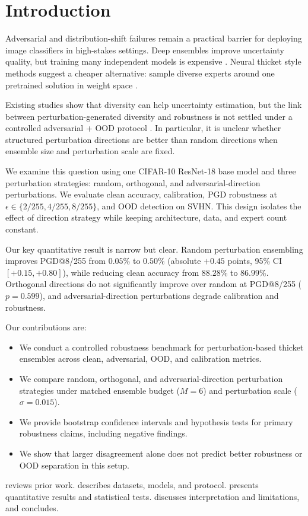 \section{Introduction}
\label{sec:introduction}

Adversarial and distribution-shift failures remain a practical barrier for deploying image classifiers in high-stakes settings. Deep ensembles improve uncertainty quality, but training many independent models is expensive \citep{lakshminarayanan2017deep}. Neural thicket style methods suggest a cheaper alternative: sample diverse experts around one pretrained solution in weight space \citep{gan2026neuralthickets,mehrtash2020pep}.

 Existing studies show that diversity can help uncertainty estimation, but the link between perturbation-generated diversity and robustness is not settled under a controlled adversarial + OOD protocol \citep{xia2022usefulness,wei2020xensemble}. In particular, it is unclear whether structured perturbation directions are better than random directions when ensemble size and perturbation scale are fixed.

We examine this question using one CIFAR-10 ResNet-18 base model and three perturbation strategies: random, orthogonal, and adversarial-direction perturbations. We evaluate clean accuracy, calibration, PGD robustness at $\epsilon\in\{2/255,4/255,8/255\}$, and OOD detection on SVHN. This design isolates the effect of direction strategy while keeping architecture, data, and expert count constant.

Our key quantitative result is narrow but clear. Random perturbation ensembling improves PGD@8/255 from $0.05\%$ to $0.50\%$ (absolute $+0.45$ points, 95\% CI $[+0.15,+0.80]$), while reducing clean accuracy from $88.28\%$ to $86.99\%$. Orthogonal directions do not significantly improve over random at PGD@8/255 ($p=0.599$), and adversarial-direction perturbations degrade calibration and robustness.

Our contributions are:
\begin{itemize}[leftmargin=*,itemsep=0pt,topsep=0pt]
    \item We conduct a controlled robustness benchmark for perturbation-based thicket ensembles across clean, adversarial, OOD, and calibration metrics.
    \item We compare random, orthogonal, and adversarial-direction perturbation strategies under matched ensemble budget ($M=6$) and perturbation scale ($\sigma=0.015$).
    \item We provide bootstrap confidence intervals and hypothesis tests for primary robustness claims, including negative findings.
    \item We show that larger disagreement alone does not predict better robustness or OOD separation in this setup.
\end{itemize}

  reviews prior work.  describes datasets, models, and protocol.  presents quantitative results and statistical tests.  discusses interpretation and limitations, and  concludes.

